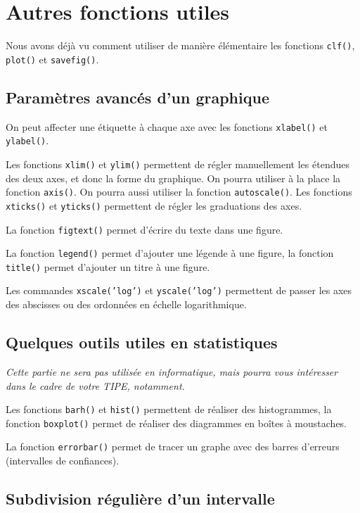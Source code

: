 \section{Autres fonctions utiles}

Nous avons déjà vu comment utiliser de manière élémentaire les fonctions \texttt{clf()}, \texttt{plot()} et \texttt{savefig()}.

\subsection{Paramètres avancés d'un graphique}

On peut affecter une étiquette à chaque axe avec les fonctions \texttt{xlabel()} et \texttt{ylabel()}.

Les fonctions \texttt{xlim()} et \texttt{ylim()} permettent de régler manuellement les étendues des deux axes, et donc la forme du graphique. On pourra utiliser à la place la fonction \texttt{axis()}.
On pourra aussi utiliser la fonction \texttt{autoscale()}.
Les fonctions \texttt{xticks()} et \texttt{yticks()} permettent de régler les graduations des axes. 

La fonction \texttt{figtext()} permet d'écrire du texte dans une figure. 

La fonction \texttt{legend()} permet d'ajouter une légende à une figure, la fonction \texttt{title()} permet d'ajouter un titre à une figure. 

Les commandes \texttt{xscale('log')} et \texttt{yscale('log')} permettent de passer les axes des abscisses ou des ordonnées en échelle logarithmique. 

\subsection{Quelques outils utiles en statistiques}

\emph{Cette partie ne sera pas utilisée en informatique, mais pourra vous intéresser dans le cadre de votre TIPE, notamment.}

Les fonctions \texttt{barh()} et \texttt{hist()} permettent de réaliser des histogrammes, la fonction \texttt{boxplot()} permet de réaliser des diagrammes en boîtes à moustaches.

La fonction \texttt{errorbar()} permet de tracer un graphe avec des barres d'erreurs (intervalles de confiances). 

\subsection{Subdivision régulière d'un intervalle}

